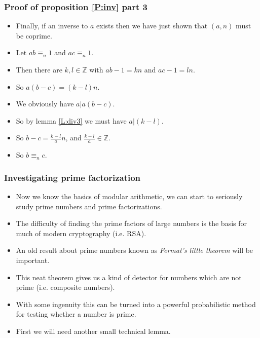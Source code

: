 \documentclass[handout]{beamer}
\newcommand{\bZ}{\mathbb{Z}}
\begin{document}
\begin{frame}
\frametitle{Proof of proposition \ref{P:inv} part 3}
\begin{itemize}
\item Finally, if an inverse to $a$ exists then we have just shown that $(a,n)$ must be coprime. 
\vspace{0.2cm} 
\item Let $ab\equiv_n 1$ and $ac\equiv_n 1$. 
\vspace{0.2cm} 
\item Then there are $k,l\in\bZ$ with $ab - 1 = k n$ and $ac - 1 = ln$. 
\vspace{0.2cm} 
\item So $a(b-c) = (k-l)n$. 
\vspace{0.2cm} 
\item We obviously have $a|a(b-c)$.
\vspace{0.2cm} 
\item So by lemma \ref{L:div3} we must have $a|(k-l)$. 
\vspace{0.2cm} 
\item So $b-c = \frac{k-l}{a}n$, and $\frac{k-l}{a}\in\bZ$.
\vspace{0.2cm} 
\item So $b\equiv_n c$. 
\end{itemize}
\end{frame}

\begin{frame}
\frametitle{Investigating prime factorization}
\begin{itemize}
\item Now we know the basics of modular arithmetic, we can start to seriously study prime numbers and prime factorizations. 
\vspace{0.2cm} 
\item The difficulty of finding the prime factors of large numbers is the basis for much of modern cryptography (i.e. RSA). 
\vspace{0.2cm} 
\item An old result about prime numbers known as \emph{Fermat's little theorem} will be important. 
\vspace{0.2cm} 
\item This neat theorem gives us a kind of detector for numbers which are not prime (i.e. composite numbers).
\vspace{0.2cm} 
\item With some ingenuity this can be turned into a powerful probabilistic method for testing whether a number is prime. 
\vspace{0.2cm} 
\item First we will need another small technical lemma. 
\end{itemize}
\end{frame}
\end{document}

